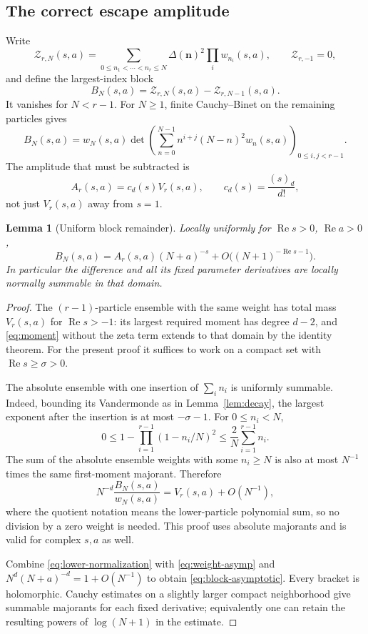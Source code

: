 \documentclass[11pt,letterpaper]{article}
\numberwithin{equation}{section}
\newtheorem{lemma}[theorem]{Lemma}
\theoremstyle{definition}\newtheorem{definition}[theorem]{Definition}
\theoremstyle{remark}\newtheorem{remark}[theorem]{Remark}
\DeclareMathOperator{\Rea}{Re}
\newcommand{\Z}{\mathcal Z}\newcommand{\Bell}{\mathcal B}
\begin{document}
\subsection{The correct escape amplitude}
Write
\[
 \Z_{r,N}(s,a)=\sum_{0\le n_1<\cdots<n_r\le N}
       \Delta(\bm n)^2\prod_iw_{n_i}(s,a),\qquad \Z_{r,-1}=0,
\]
and define the largest-index block
\begin{equation}\label{eq:block}
 B_N(s,a)=\Z_{r,N}(s,a)-\Z_{r,N-1}(s,a).
\end{equation}
It vanishes for $N<r-1$. For $N\ge1$, finite Cauchy--Binet on the
remaining particles gives
\begin{equation}\label{eq:block-det}
 B_N(s,a)=w_N(s,a)
 \det\left(\sum_{n=0}^{N-1}n^{i+j}(N-n)^2w_n(s,a)\right)_{0\le i,j<r-1}.
\end{equation}
The amplitude that must be subtracted is
\begin{equation}\label{eq:amplitude}
 A_r(s,a)=c_d(s)V_r(s,a),\qquad c_d(s)=\frac{(s)_d}{d!},
\end{equation}
not just $V_r(s,a)$ away from $s=1$.

\begin{lemma}[Uniform block remainder]\label{lem:block}
Locally uniformly for $\Rea s>0$, $\Rea a>0$,
\begin{equation}\label{eq:block-asymptotic}
 B_N(s,a)=A_r(s,a)(N+a)^{-s}
       +O\bigl((N+1)^{-\Rea s-1}\bigr).
\end{equation}
In particular the difference and all its fixed parameter derivatives
are locally normally summable in that domain.
\end{lemma}
\begin{proof}
The $(r-1)$-particle ensemble with the same weight has total mass $V_r(s,a)$
for $\Rea s>-1$: its largest required moment has degree $d-2$, and
\eqref{eq:moment} without the zeta term extends to that domain by the
identity theorem. For the present proof it suffices to work on a compact
set with $\Rea s\ge\sigma>0$.

The absolute ensemble with one insertion of $\sum_i n_i$ is uniformly
summable. Indeed, bounding its Vandermonde as in Lemma~\ref{lem:decay},
the largest exponent after the insertion is at most $-\sigma-1$.
For $0\le n_i<N$,
\[
 0\le1-\prod_{i=1}^{r-1}(1-n_i/N)^2
       \le\frac2N\sum_{i=1}^{r-1}n_i.
\]
The sum of the absolute ensemble weights with some $n_i\ge N$ is also
at most $N^{-1}$ times the same first-moment majorant. Therefore
\begin{equation}\label{eq:lower-normalization}
 N^{-d}\frac{B_N(s,a)}{w_N(s,a)}=V_r(s,a)+O(N^{-1}),
\end{equation}
where the quotient notation means the lower-particle polynomial sum,
so no division by a zero weight is needed. This proof uses absolute
majorants and is valid for complex $s,a$ as well.

Combine \eqref{eq:lower-normalization} with
\eqref{eq:weight-asymp} and
$N^d(N+a)^{-d}=1+O(N^{-1})$ to obtain
\eqref{eq:block-asymptotic}. Every bracket is holomorphic. Cauchy
estimates on a slightly larger compact neighborhood give summable
majorants for each fixed derivative; equivalently one can retain the
resulting powers of $\log(N+1)$ in the estimate.
\end{proof}
\end{document}
